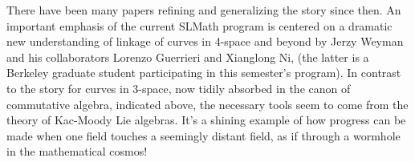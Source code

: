 \documentclass[11pt, oneside]{article}   	%
\begin{document}
There have been many papers refining and generalizing the story since then. An important emphasis of the current SLMath program is centered on a dramatic new understanding of linkage of curves in 4-space and beyond by Jerzy Weyman and his collaborators
Lorenzo Guerrieri and Xianglong Ni, (the latter is a Berkeley graduate student participating in this semester's program).
In contrast to the story for curves in 3-space, now tidily absorbed in the canon of commutative algebra, indicated above, the necessary tools seem to come from the theory of Kac-Moody Lie algebras. It's a shining example of how progress can be made when one field touches a seemingly distant field, as if through a wormhole in the mathematical cosmos! 
\end{document}
